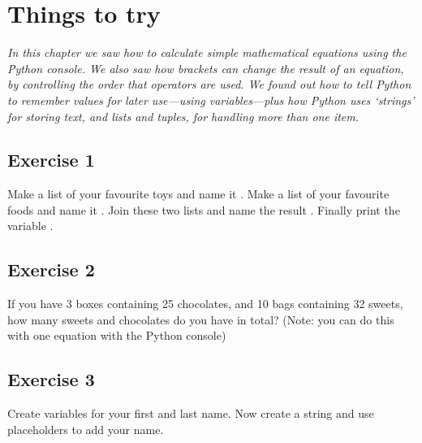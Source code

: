 \section{Things to try}

\emph{In this chapter we saw how to calculate simple mathematical equations using the Python console.  We also saw how brackets can change the result of an equation, by controlling the order that operators are used.  We found out how to tell Python to remember values for later use---using variables---plus how Python uses `strings' for storing text, and lists and tuples, for handling more than one item.}
\par

\subsection*{Exercise 1}
Make a list of your favourite toys and name it .  Make a list of your favourite foods and name it .  Join these two lists and name the result .  Finally print the variable .

\subsection*{Exercise 2}
If you have 3 boxes containing 25 chocolates, and 10 bags containing 32 sweets, how many sweets and chocolates do you have in total?  (Note: you can do this with one equation with the Python console)

\subsection*{Exercise 3}
Create variables for your first and last name. Now create a string and use placeholders to add your name.


\newpage

